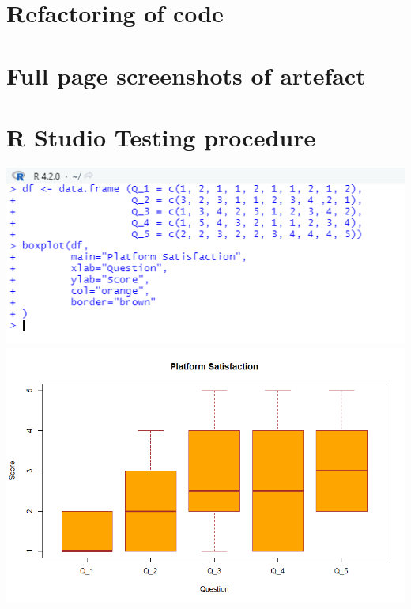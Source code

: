 \documentclass[lettersize,journal]{IEEEtran}
\begin{document}
\section{Refactoring of code}

\section{Full page screenshots of artefact}
\clearpage

\section{R Studio Testing procedure}
\includegraphics[width=\textwidth]{R.png}
\includegraphics[width=\textwidth]{boxAndWhisker.png}
\newpage
\clearpage
\twocolumn
\end{document}
